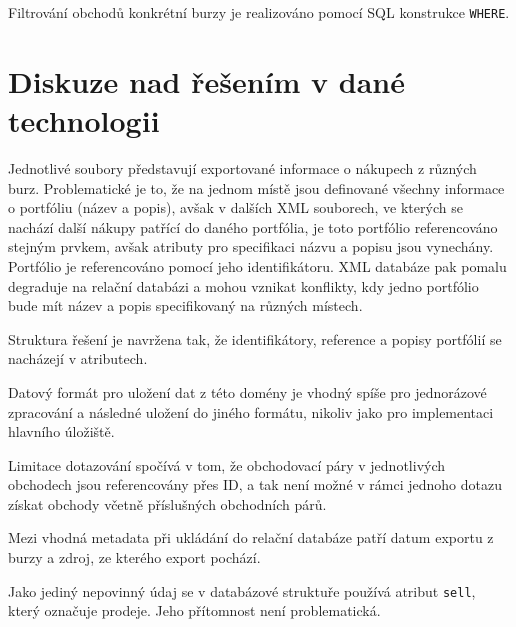 \documentclass[12pt, a4paper]{article}
\let\oldsection\section
\renewcommand\section{\clearpage\oldsection}
\begin{document}
Filtrování obchodů konkrétní burzy je realizováno pomocí SQL konstrukce \texttt{WHERE}.

\section{Diskuze nad řešením v dané technologii}

Jednotlivé soubory představují exportované informace o nákupech z různých burz. Problematické je to, že na jednom místě jsou definované všechny informace o portfóliu (název a popis), avšak v dalších XML souborech, ve kterých se nachází další nákupy patřící do daného portfólia, je toto portfólio referencováno stejným prvkem, avšak atributy pro specifikaci názvu a popisu jsou vynechány. Portfólio je referencováno pomocí jeho identifikátoru. XML databáze pak pomalu degraduje na relační databázi a mohou vznikat konflikty, kdy jedno portfólio bude mít název a popis specifikovaný na různých místech.

Struktura řešení je navržena tak, že identifikátory, reference a popisy portfólií se nacházejí v atributech. 

Datový formát pro uložení dat z této domény je vhodný spíše pro jednorázové zpracování a následné uložení do jiného formátu, nikoliv jako pro implementaci hlavního úložiště.

Limitace dotazování spočívá v tom, že obchodovací páry v jednotlivých obchodech jsou referencovány přes ID, a tak není možné v rámci jednoho dotazu získat obchody včetně příslušných obchodních párů.

Mezi vhodná metadata při ukládání do relační databáze patří datum exportu z burzy a zdroj, ze kterého export pochází.

Jako jediný nepovinný údaj se v databázové struktuře používá atribut \texttt{sell}, který označuje prodeje. Jeho přítomnost není problematická.
\end{document}
